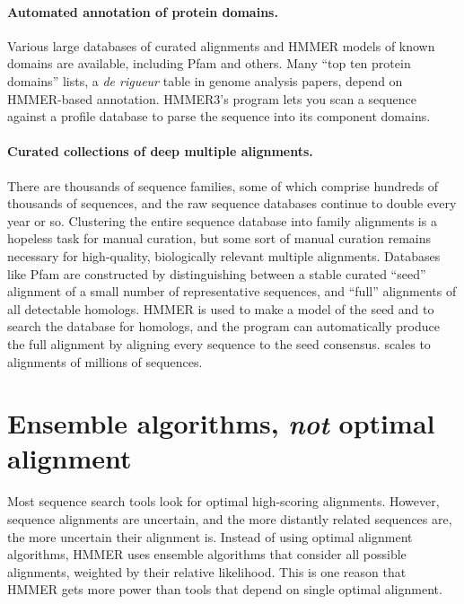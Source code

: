 \paragraph{Automated annotation of protein domains.}
Various large databases of curated alignments and HMMER models of
known domains are available, including Pfam and others.  Many ``top
ten protein domains'' lists, a \emph{de rigueur} table in genome
analysis papers, depend on HMMER-based annotation. HMMER3's
 program lets you scan a sequence against a profile
database to parse the sequence into its component domains.

\paragraph{Curated collections of deep multiple alignments.}  There are thousands of
sequence families, some of which comprise hundreds of thousands of
sequences, and the raw sequence databases continue to double every
year or so. Clustering the entire sequence database into family
alignments is a hopeless task for manual curation, but some sort of
manual curation remains necessary for high-quality, biologically
relevant multiple alignments. Databases like Pfam are constructed by
distinguishing between a stable curated ``seed'' alignment of a small
number of representative sequences, and ``full'' alignments of all
detectable homologs. HMMER is used to make a model of the seed and to
search the database for homologs, and the  program can
automatically produce the full alignment by aligning every sequence to
the seed consensus.  scales to alignments of 
millions of sequences.



\section{Ensemble algorithms, \emph{not} optimal alignment}

Most sequence search tools look for optimal high-scoring
alignments. However, sequence alignments are uncertain, and the more
distantly related sequences are, the more uncertain their alignment
is. Instead of using optimal alignment algorithms, HMMER uses ensemble
algorithms that consider all possible alignments, weighted by their
relative likelihood. This is
one reason that HMMER gets more power than tools that depend on single
optimal alignment.

